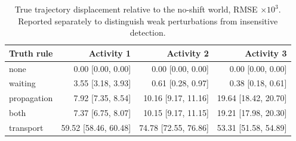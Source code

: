 \begin{table}[H]
\centering
\caption{True trajectory displacement relative to the no-shift world, RMSE $\times10^3$. Reported separately to distinguish weak perturbations from insensitive detection.}
\label{tab:stress_magnitude}
\scriptsize
\setlength{\tabcolsep}{3pt}
\begin{tabular}{lrrr}
\toprule
Truth rule & Activity 1 & Activity 2 & Activity 3 \\
\midrule
none & 0.00 [0.00, 0.00] & 0.00 [0.00, 0.00] & 0.00 [0.00, 0.00] \\
waiting & 3.55 [3.18, 3.93] & 0.61 [0.28, 0.97] & 0.38 [0.18, 0.61] \\
propagation & 7.92 [7.35, 8.54] & 10.16 [9.17, 11.16] & 19.64 [18.42, 20.70] \\
both & 7.37 [6.75, 8.07] & 10.15 [9.17, 11.15] & 19.21 [17.98, 20.30] \\
transport & 59.52 [58.46, 60.48] & 74.78 [72.55, 76.86] & 53.31 [51.58, 54.89] \\
\bottomrule
\end{tabular}
\end{table}
